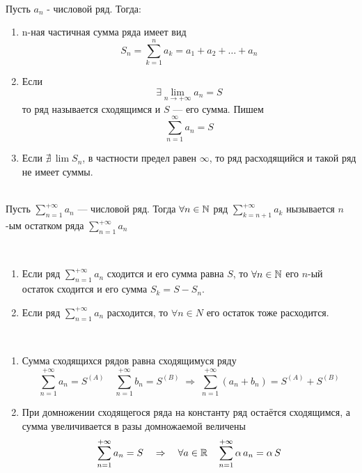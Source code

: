 \begin{Def}~\\
	Пусть $a_n$ - числовой ряд. Тогда:
	\begin{enumerate}
        \item n-ная частичная сумма ряда имеет вид
        \[
            S_n = \sum^n_{k = 1}a_k = a_1 + a_2 + \dots + a_n
        \]
         
        \item Если 
        \[
            \exists \lim_{n \rightarrow +\infty} a_n = S
        \]
        то ряд называется сходящимся и $S$ --- его сумма. Пишем 
        \[
            \sum^{\infty}_{n = 1}a_n = S
        \]
         
        \item Если $\nexists\,\lim S_n$, в частности предел равен $\infty$, то ряд расходящийся и такой ряд не имеет суммы.
    \end{enumerate}
\end{Def}

\begin{Def}~\\
	Пусть $\sum^{+\infty}_{n = 1}a_n$ --- числовой ряд. Тогда $\forall n \in \mathbb{N}$ ряд $\sum^{+\infty}_{k = n + 1}a_k$
    нызывается $n$-ым остатком ряда $\sum^{+\infty}_{n = 1}a_n$
\end{Def}

\pagebreak

\begin{Note}~
    \begin{enumerate}
        \item[\textbullet] Если ряд $\sum^{+\infty}_{n = 1}a_n$
        сходится и его сумма равна $S$, то $\forall n \in \mathbb{N}$ его $n$-ый остаток сходится и его сумма $S_k = S - S_n$.
        
        \item[\textbullet] Если ряд $\sum^{+\infty}_{n = 1}a_n$ расходится, то $\forall n \in N$ его остаток тоже расходится.
    \end{enumerate}
    
\end{Note}

\begin{Note}~
    \begin{enumerate}
        \item Сумма сходящихся рядов равна сходящимуся ряду  
        \[
            \sum^{+\infty}_{n=1}a_n = S^{(A)} \quad \sum^{+\infty}_{n=1}b_n = S^{(B)}\; \Rightarrow\; \sum^{+\infty}_{n=1}(a_n + b_n) = S^{(A)} + S^{(B)}
        \]
         
        \item При домножении сходящегося ряда на константу ряд остаётся сходящимся, а сумма увеличивается в разы домножаемой величены
        \[
            \sum^{+\infty}_{n=1}a_n = S \quad \Rightarrow \quad \forall a \in \mathbb{R} \quad \sum^{+\infty}_{n=1}\alpha\,a_n = \alpha\,S
        \]
    \end{enumerate}
\end{Note}

